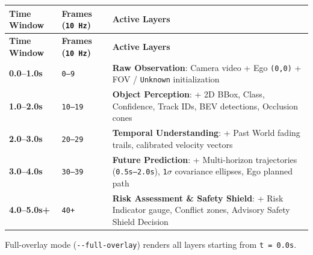 \documentclass[10.5pt,a4paper]{article}
\begin{document}
\begin{footnotesize}
\setlength{\tabcolsep}{4pt}
\setlength{\LTleft}{0pt}\setlength{\LTright}{0pt}
\begin{longtable}{>{\raggedright\arraybackslash}p{} >{\raggedright\arraybackslash}p{} >{\raggedright\arraybackslash}p{}}
\toprule
\textbf{Time Window} & \textbf{Frames (\texttt{10 Hz})} & \textbf{Active Layers} \\
\midrule
\endfirsthead
\toprule
\textbf{Time Window} & \textbf{Frames (\texttt{10 Hz})} & \textbf{Active Layers} \\
\midrule
\endhead
\bottomrule
\endfoot
\textbf{0.0--1.0s} & \texttt{0--9} & \textbf{Raw Observation}: Camera video + Ego \texttt{(0,\allowbreak{}0)} + FOV / \texttt{Unknown} initialization \\
\textbf{1.0--2.0s} & \texttt{10--19} & \textbf{Object Perception}: + 2D BBox, Class, Confidence, Track IDs, BEV detections, Occlusion cones \\
\textbf{2.0--3.0s} & \texttt{20--29} & \textbf{Temporal Understanding}: + Past World fading trails, calibrated velocity vectors \\
\textbf{3.0--4.0s} & \texttt{30--39} & \textbf{Future Prediction}: + Multi-horizon trajectories (\texttt{0.\allowbreak{}5s--2.\allowbreak{}0s}), \texttt{1$\sigma$} covariance ellipses, Ego planned path \\
\textbf{4.0--5.0s+} & \texttt{40+} & \textbf{Risk Assessment \& Safety Shield}: + Risk Indicator gauge, Conflict zones, Advisory Safety Shield Decision \\
\end{longtable}
\end{footnotesize}


Full-overlay mode (\texttt{-\allowbreak{}-\allowbreak{}full-\allowbreak{}overlay}) renders all layers starting from \texttt{t = 0.\allowbreak{}0s}.
\end{document}
